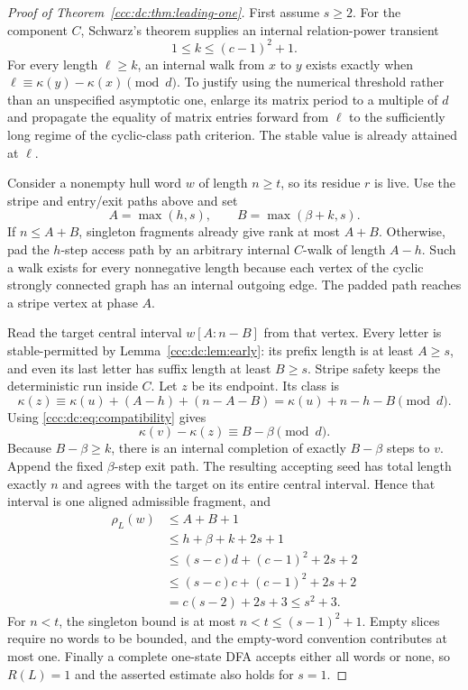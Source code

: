 \documentclass[11pt,letterpaper]{article}
\theoremstyle{definition}
\theoremstyle{remark}
\newcommand{\rank}{\rho}
\begin{document}
\begin{proof}[Proof of Theorem~\ref{ccc:dc:thm:leading-one}]
First assume $s\ge2$. For the component $C$, Schwarz's theorem supplies an internal relation-power transient
\[
1\le k\le(c-1)^2+1.
\]
For every length $\ell\ge k$, an internal walk from $x$ to $y$ exists exactly when $\ell\equiv\kappa(y)-\kappa(x)\pmod d$. To justify using the numerical threshold rather than an unspecified asymptotic one, enlarge its matrix period to a multiple of $d$ and propagate the equality of matrix entries forward from $\ell$ to the sufficiently long regime of the cyclic-class path criterion. The stable value is already attained at $\ell$.

Consider a nonempty hull word $w$ of length $n\ge t$, so its residue $r$ is live. Use the stripe and entry/exit paths above and set
\[
A=\max(h,s),\qquad B=\max(\beta+k,s).
\]
If $n\le A+B$, singleton fragments already give rank at most $A+B$. Otherwise, pad the $h$-step access path by an arbitrary internal $C$-walk of length $A-h$. Such a walk exists for every nonnegative length because each vertex of the cyclic strongly connected graph has an internal outgoing edge. The padded path reaches a stripe vertex at phase $A$.

Read the target central interval $w[A:n-B]$ from that vertex. Every letter is stable-permitted by Lemma~\ref{ccc:dc:lem:early}: its prefix length is at least $A\ge s$, and even its last letter has suffix length at least $B\ge s$. Stripe safety keeps the deterministic run inside $C$. Let $z$ be its endpoint. Its class is
\[
\kappa(z)\equiv\kappa(u)+(A-h)+(n-A-B)
=\kappa(u)+n-h-B\pmod d.
\]
Using \eqref{ccc:dc:eq:compatibility} gives
\[
\kappa(v)-\kappa(z)\equiv B-\beta\pmod d.
\]
Because $B-\beta\ge k$, there is an internal completion of exactly $B-\beta$ steps to $v$. Append the fixed $\beta$-step exit path. The resulting accepting seed has total length exactly $n$ and agrees with the target on its entire central interval. Hence that interval is one aligned admissible fragment, and
\begin{align*}
\rank_L(w)&\le A+B+1\\
&\le h+\beta+k+2s+1\\
&\le(s-c)d+(c-1)^2+2s+2\\
&\le(s-c)c+(c-1)^2+2s+2\\
&=c(s-2)+2s+3\le s^2+3.
\end{align*}
For $n<t$, the singleton bound is at most $n<t\le(s-1)^2+1$. Empty slices require no words to be bounded, and the empty-word convention contributes at most one. Finally a complete one-state DFA accepts either all words or none, so $R(L)=1$ and the asserted estimate also holds for $s=1$.
\end{proof}
\end{document}
